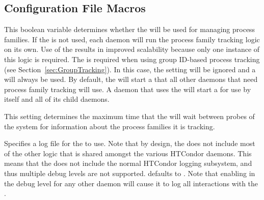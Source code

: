 
\subsection{\label{sec:Procd-Config-File-Entries}
Configuration File Macros}

\begin{description}

\label{param:UseProcd}
\item[\Macro{USE\_PROCD}]
  This boolean variable
  determines whether the  will be used for
  managing process families. If the  is not used, each
  daemon will run the process family tracking logic on its own. Use of
  the  results in improved scalability because only one
  instance of this logic is required. 
  The  is required when using 
  group ID-based process tracking (see
  Section~\ref{sec:GroupTracking}). In this case, the
   setting will be ignored and a  will
  always be used. 
  By default, the  will start a
   that all other daemons that need process family tracking 
  will use.
  A daemon that uses the  will start a  for
  use by itself and all of its child daemons.

\label{param:ProcdMaxSnapshotInterval}
\item[\Macro{PROCD\_MAX\_SNAPSHOT\_INTERVAL}]
  This setting determines the maximum time that the  will
  wait between probes of the system for information about the process
  families it is tracking.

\label{param:ProcdLog}
\item[\Macro{PROCD\_LOG}]
  Specifies a log file for the  to use.
  Note that by design, the  does not
  include most of the other logic that is shared amongst the various
  HTCondor daemons. 
  This means that the 
  does not include the normal HTCondor logging subsystem, and thus 
  multiple debug levels are not supported.
   defaults to .
  Note that enabling  in the debug level for any
  other daemon will cause it to log all interactions with the
  .



\end{description}
